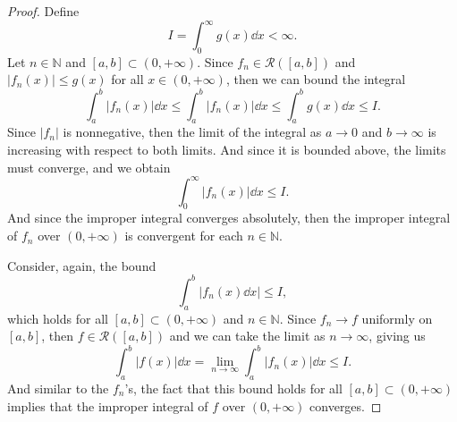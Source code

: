 \documentclass[12pt]{article}
\theoremstyle{definition}
\newcommand{\N}{\mathbb{N}}
\newcommand{\RR}{\mathcal{R}}
\begin{document}
\begin{proof}
    Define
    \[
        I = \int_{0}^{\infty} g(x) \dd{x} < \infty.
    \]
    Let $n \in \N$ and $[a, b] \subset (0, + \infty)$. Since $f_n \in \RR([a,b])$ and $|f_n(x)| \leq g(x)$ for all $x \in (0, +\infty)$, then we can bound the integral
    \[
        \int_{a}^{b} |f_n(x)| \dd{x}
            \leq \int_{a}^{b} |f_n(x)| \dd{x}
            \leq \int_{a}^{b} g(x) \dd{x}
            \leq I.
    \]
    Since $|f_n|$ is nonnegative, then the limit of the integral as $a \to 0$ and $b \to \infty$ is increasing with respect to both limits. And since it is bounded above, the limits must converge, and we obtain
    \[
        \int_{0}^{\infty} |f_n(x)| \dd{x} \leq I.
    \]
    And since the improper integral converges absolutely, then the improper integral of $f_n$ over $(0, +\infty)$ is convergent for each $n \in \N$.
    
    Consider, again, the bound
    \[
        \int_{a}^{b} |f_n(x) \dd{x}| \leq I,
    \]
    which holds for all $[a, b] \subset (0, +\infty)$ and $n \in \N$. Since $f_n \to f$ uniformly on $[a, b]$, then $f \in \RR([a, b])$ and we can take the limit as $n \to \infty$, giving us
    \[
        \int_{a}^{b} |f(x)| \dd{x}
            = \lim_{n \to \infty} \int_{a}^{b} |f_n(x)| \dd{x}
            \leq I.
    \]
    And similar to the $f_n$'s, the fact that this bound holds for all $[a, b] \subset (0, +\infty)$ implies that the improper integral of $f$ over $(0, +\infty)$ converges.
    

\end{proof}
\end{document}
